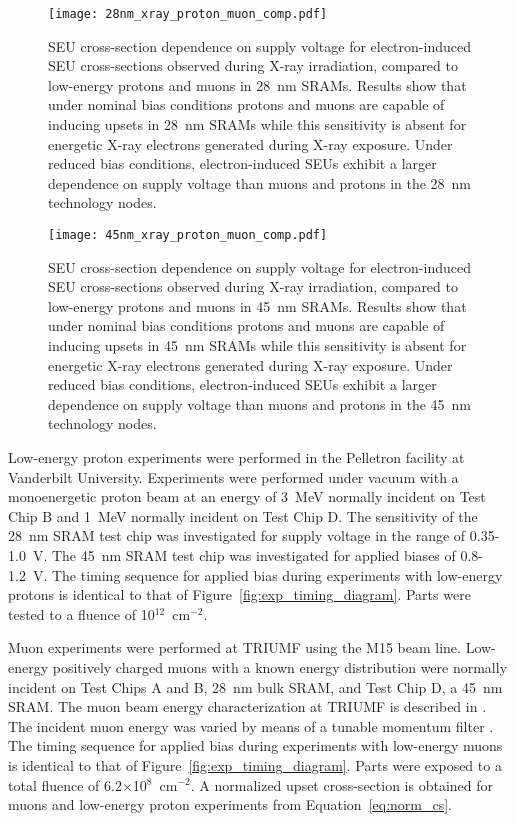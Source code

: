 \begin{figure}[tb]
    \begin{center}
        \texttt{[image: 28nm\_xray\_proton\_muon\_comp.pdf]}
    \end{center}
    \caption{SEU cross-section dependence on supply voltage for electron-induced SEU cross-sections observed during X-ray irradiation, compared to low-energy protons and muons in 28~nm SRAMs. Results show that under nominal bias conditions protons and muons are capable of inducing upsets in 28~nm SRAMs while this sensitivity is absent for energetic X-ray electrons generated during X-ray exposure. Under reduced bias conditions, electron-induced SEUs exhibit a larger dependence on supply voltage than muons and protons in the 28~nm technology nodes.}
    \label{fig:28nm_xray_muon_proton}
\end{figure}
\begin{figure}[tb]
    \begin{center}
        \texttt{[image: 45nm\_xray\_proton\_muon\_comp.pdf]}
    \end{center}
    \caption{SEU cross-section dependence on supply voltage for electron-induced SEU cross-sections observed during X-ray irradiation, compared to low-energy protons and muons in 45~nm SRAMs. Results show that under nominal bias conditions protons and muons are capable of inducing upsets in 45~nm SRAMs while this sensitivity is absent for energetic X-ray electrons generated during X-ray exposure. Under reduced bias conditions, electron-induced SEUs exhibit a larger dependence on supply voltage than muons and protons in the 45~nm technology nodes.}
    \label{fig:45nm_xray_muon_proton}
\end{figure}

Low-energy proton experiments were performed in the Pelletron facility at Vanderbilt University. 
Experiments were performed under vacuum with a monoenergetic proton beam at an energy of 3~MeV normally incident on Test Chip B and 1~MeV normally incident on Test Chip D. 
The sensitivity of the 28~nm SRAM test chip was investigated for supply voltage in the range of 0.35-1.0~V. 
The 45~nm SRAM test chip was investigated for applied biases of 0.8-1.2~V. 
The timing sequence for applied bias during experiments with low-energy protons is identical to that of Figure~\ref{fig:exp_timing_diagram}. 
Parts were tested to a fluence of 10$^{12}$~cm$^{-2}$.

Muon experiments were performed at TRIUMF using the M15 beam line. 
Low-energy positively charged muons with a known energy distribution were normally incident on Test Chips A and B, 28~nm bulk SRAM, and Test Chip D, a 45~nm SRAM. 
The muon beam energy characterization at TRIUMF is described in \cite{Sierawski:2010cj}. 
The incident muon energy was varied by means of a tunable momentum filter \cite{Sierawski:2010cj, Sierawski:2011bn}. 
The timing sequence for applied bias during experiments with low-energy muons is identical to that of Figure~\ref{fig:exp_timing_diagram}.
Parts were exposed to a total fluence of 6.2$\times$10$^8$~cm$^{-2}$. A normalized upset cross-section is obtained for muons and low-energy proton experiments from Equation~\ref{eq:norm_cs}.


